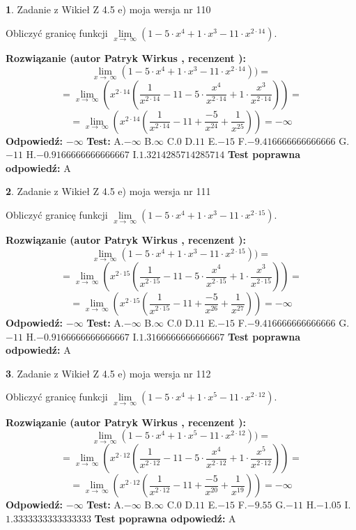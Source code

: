 \documentclass[12pt, a4paper]{article}
\theoremstyle{definition} %
\newtheorem{zad}{}
\newcommand{\zadStart}[1]{\begin{zad}#1\newline}
\newcommand{\zadStop}{\end{zad}}
\newcommand{\rozwStart}[2]{\noindent \textbf{Rozwiązanie (autor #1 , recenzent #2): }\newline}
\newcommand{\rozwStop}{\newline}
\newcommand{\odpStart}{\noindent \textbf{Odpowiedź:}\newline}
\newcommand{\odpStop}{\newline}
\newcommand{\testStart}{\noindent \textbf{Test:}\newline}
\newcommand{\testStop}{\newline}
\newcommand{\kluczStart}{\noindent \textbf{Test poprawna odpowiedź:}\newline}
\newcommand{\kluczStop}{\newline}
\begin{document}
\zadStart{Zadanie z Wikieł Z 4.5 e) moja wersja nr 110}


Obliczyć granicę funkcji  $\lim\limits_{x\to\ \infty}(1 - 5 \cdot x^{4}+1 \cdot x^{3}- 11 \cdot x^{2\cdot14})$.
\zadStop
\rozwStart{Patryk Wirkus}{}
$$\lim\limits_{x\to\ \infty}(1 - 5 \cdot x^{4}+1 \cdot x^{3}- 11 \cdot x^{2\cdot14}))=$$
$$=\lim\limits_{x\to\ \infty}(x^{2\cdot14}(\frac{1}{x^{2\cdot14}}-11 -5 \cdot \frac{x^{4}}{x^{2\cdot14}}+1 \cdot \frac{x^{3}}{x^{2\cdot14}}))=$$
$$=\lim\limits_{x\to\ \infty}(x^{2\cdot14}(\frac{1}{x^{2\cdot14}}-11 + \frac{-5}{x^{24}}+ \frac{1}{x^{25}}))=-\infty$$
\rozwStop
\odpStart
$-\infty$
\odpStop
\testStart
A.$-\infty$ B.$\infty$ C.$0$ D.$11$ E.$-15$
F.$-9.416666666666666$ G.$-11$
H.$-0.9166666666666667$
I.$1.3214285714285714$
\testStop
\kluczStart
A
\kluczStop



\zadStart{Zadanie z Wikieł Z 4.5 e) moja wersja nr 111}


Obliczyć granicę funkcji  $\lim\limits_{x\to\ \infty}(1 - 5 \cdot x^{4}+1 \cdot x^{3}- 11 \cdot x^{2\cdot15})$.
\zadStop
\rozwStart{Patryk Wirkus}{}
$$\lim\limits_{x\to\ \infty}(1 - 5 \cdot x^{4}+1 \cdot x^{3}- 11 \cdot x^{2\cdot15}))=$$
$$=\lim\limits_{x\to\ \infty}(x^{2\cdot15}(\frac{1}{x^{2\cdot15}}-11 -5 \cdot \frac{x^{4}}{x^{2\cdot15}}+1 \cdot \frac{x^{3}}{x^{2\cdot15}}))=$$
$$=\lim\limits_{x\to\ \infty}(x^{2\cdot15}(\frac{1}{x^{2\cdot15}}-11 + \frac{-5}{x^{26}}+ \frac{1}{x^{27}}))=-\infty$$
\rozwStop
\odpStart
$-\infty$
\odpStop
\testStart
A.$-\infty$ B.$\infty$ C.$0$ D.$11$ E.$-15$
F.$-9.416666666666666$ G.$-11$
H.$-0.9166666666666667$
I.$1.3166666666666667$
\testStop
\kluczStart
A
\kluczStop



\zadStart{Zadanie z Wikieł Z 4.5 e) moja wersja nr 112}


Obliczyć granicę funkcji  $\lim\limits_{x\to\ \infty}(1 - 5 \cdot x^{4}+1 \cdot x^{5}- 11 \cdot x^{2\cdot12})$.
\zadStop
\rozwStart{Patryk Wirkus}{}
$$\lim\limits_{x\to\ \infty}(1 - 5 \cdot x^{4}+1 \cdot x^{5}- 11 \cdot x^{2\cdot12}))=$$
$$=\lim\limits_{x\to\ \infty}(x^{2\cdot12}(\frac{1}{x^{2\cdot12}}-11 -5 \cdot \frac{x^{4}}{x^{2\cdot12}}+1 \cdot \frac{x^{5}}{x^{2\cdot12}}))=$$
$$=\lim\limits_{x\to\ \infty}(x^{2\cdot12}(\frac{1}{x^{2\cdot12}}-11 + \frac{-5}{x^{20}}+ \frac{1}{x^{19}}))=-\infty$$
\rozwStop
\odpStart
$-\infty$
\odpStop
\testStart
A.$-\infty$ B.$\infty$ C.$0$ D.$11$ E.$-15$
F.$-9.55$ G.$-11$
H.$-1.05$
I.$1.3333333333333333$
\testStop
\kluczStart
A
\kluczStop
\end{document}
